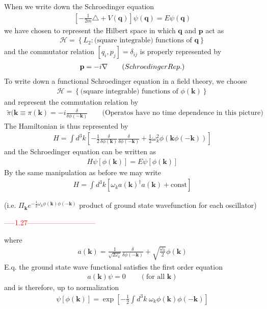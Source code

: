 \documentclass{article}
\begin{document}
When we write down the Schroedinger equation 
\begin{align}
\left[-\frac{1}{2m}\triangle + V(\mathbf{q})\right]\psi(\mathbf{q})=E\psi(\mathbf{q})
\end{align}
we have chosen to represent the Hilbert space in which $\mathbf{q}$ and $\mathbf{p}$ act as
\begin{align}
\mathcal{H}=\left\{L_2: \text{(square integrable) functions of } \mathbf{q}\right\}
\end{align}
and the commutator relation $[q_i,p_j]=\delta_{ij}$ is properly represented by
\begin{align}
\mathbf{p}=-i\nabla\qquad\text(Schroedinger Rep.)
\end{align}
To write down a functional Schroedinger equation in a field theory, we choose
\begin{align}
\mathcal{H}=\left\{\text{(square integrable) functions of } \phi(\mathbf{k})\right\}
\end{align}
and represent the commutation relation by
\begin{align}
\tilde{\pi}(\mathbf{k}\equiv\pi(\mathbf{k})=-i\frac{\delta}{\delta\phi(-\mathbf{k})}\qquad\text{(Operatos have no time dependence in this picture)}
\end{align}
The Hamiltonian is thus represented by
\begin{align}
H=\int d^3k\left[-\frac{1}{2}\frac{\delta}{\delta\phi(\mathbf{k})}\frac{\delta}{\delta\phi(\mathbf{-k})}+\frac{1}{2}\omega_k^2\phi(\mathbf{k}\phi(-\mathbf{k}))\right]
\end{align}
and the Schroedinger equation can be written as
\begin{align}
H\psi[\phi(\mathbf{k})]=E\psi[\phi(\mathbf{k})]
\end{align}
By the same manipulation as before we may write
\begin{align}
H=\int d^3k[\omega_k a(\mathbf{k})^\dagger a(\mathbf{k})+\text{const}]
\end{align}

(i.e. $\Pi_\mathbf{k}e^{-\frac{1}{2}\omega_k\phi(\mathbf{k})\phi(\mathbf{-k})}$ product of ground state wavefunction for each oscillator)

\textcolor{red}{-----1.27-----------------------------}
\newline

where
\begin{align}
a(\mathbf{k})=\frac{1}{\sqrt{2\omega_k}}\frac{\delta}{\delta\phi(-\mathbf{k})}+\sqrt{\frac{\omega_k}{2}}\phi(\mathbf{k})
\end{align}
E.q. the ground state wave functional satisfies the first order equation
\begin{align}
a(\mathbf{k})\psi=0\qquad(\text{for all }\mathbf{k})
\end{align}
and is therefore, up to normalization
\begin{align}
\psi[\phi(\mathbf{k})]=\exp[-\frac{1}{2}\int d^3k \;\omega_k\phi(\mathbf{k})\phi(\mathbf{-k})]
\end{align}
\end{document}
